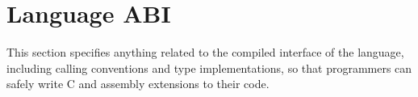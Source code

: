 \section{Language ABI}
\label{sec:abi}

This section specifies anything related to the compiled interface of
the language, including calling conventions and type implementations,
so that programmers can safely write C and assembly extensions to their
\gx{} code.

